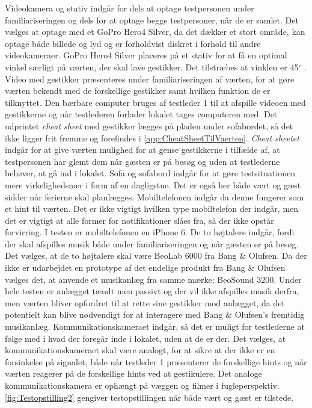 Videokamera og stativ indgår for dels at optage testpersonen under familiariseringen og dels for at optage begge testpersoner, når de er samlet. Det vælges at optage med et GoPro Hero4 Silver, da det dækker et stort område, kan optage både billede og lyd og er forholdvist diskret i forhold til andre videokameraer. GoPro Hero4 Silver placeres på et stativ for at få en optimal vinkel særligt på værten, der skal lave gestikker. Det tilstræbes at vinklen er 45$^{\circ}$ . Video med gestikker præsenteres under familiariseringen af værten, for at gøre værten bekendt med de forskellige gestikker samt hvilken funktion de er tilknyttet. Den bærbare computer bruges af testleder 1 til at afspille videoen med gestikkerne og når testlederen forlader lokalet tages computeren med. Det udprintet \textit{cheat sheet} med gestikker lægges på pladen under sofabordet, så det ikke ligger frit fremme og forefindes i \autoref{app:CheatSheetTilVaerten}. \textit{Cheat sheetet} indgår for at give værten mulighed for at gense gestikkerne i tilfælde af, at testpersonen har glemt dem når gæsten er på besøg og uden at testlederne behøver, at gå ind i lokalet. Sofa og sofabord indgår for at gøre testsituationen mere virkelighedsnær i form af en dagligstue. Det er også her både vært og gæst sidder når ferierne skal planlægges. Mobiltelefonen indgår da denne fungerer som et hint til værten. Det er ikke vigtigt hvilken type mobiltelefon der indgår, men det er vigtigt at alle former for notifikationer slåes fra, så der ikke opstår forvirring. I testen er mobiltelefonen en iPhone 6. De to højtalere indgår, fordi der skal afspilles musik både under familiariseringen og når gæsten er på besøg. Det vælges, at de to højtalere skal være BeoLab 6000 fra Bang $\&$ Olufsen. Da der ikke er udarbejdet en prototype af det endelige produkt fra Bang $\&$ Olufsen vælges det, at anvende et musikanlæg fra samme mærke; BeoSound 3200. Under hele testen er anlægget tændt men passivt og der vil ikke afspilles musik derfra, men værten bliver opfordret til at rette sine gestikker mod anlægget, da det potentielt kan blive nødvendigt for at interagere med Bang $\&$ Olufsen's fremtidig musikanlæg. Kommunikationskameraet indgår, så det er muligt for testlederne at følge med i hvad der foregår inde i lokalet, uden at de er der. Det vælges, at kommunikationskameraet skal være analogt, for at sikre at der ikke er en forsinkelse på signalet, både når testleder 1 præsenterer de forskellige hints og når værten reagerer på de forskellige hints ved at gestikulere. Det analoge kommunikationskamera er ophængt på væggen og filmer i fugleperspektiv. \autoref{fig:Testopstilling2} gengiver testopstillingen når både vært og gæst er tilstede. 
